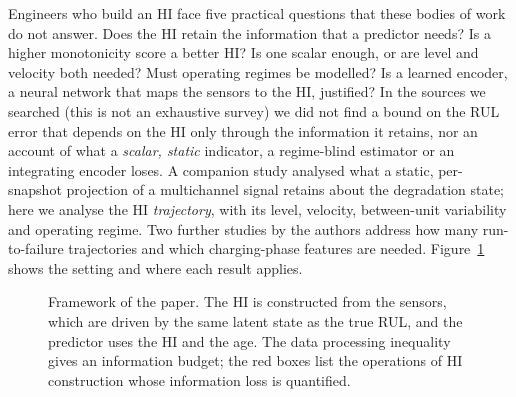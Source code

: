 \documentclass[preprint,12pt]{elsarticle}
\theoremstyle{definition}
\begin{document}
Engineers who build an HI face five practical questions that these bodies of work do not answer. Does the HI retain the information that a predictor needs? Is a higher monotonicity score a better HI? Is one scalar enough, or are level and velocity both needed? Must operating regimes be modelled? Is a learned encoder, a neural network that maps the sensors to the HI, justified? In the sources we searched (this is not an exhaustive survey) we did not find a bound on the RUL error that depends on the HI only through the information it retains, nor an account of what a \emph{scalar, static} indicator, a regime-blind estimator or an integrating encoder loses. A companion study \cite{le2026jestch} analysed what a static, per-snapshot projection of a multichannel signal retains about the degradation state; here we analyse the HI \emph{trajectory}, with its level, velocity, between-unit variability and operating regime. Two further studies by the authors address how many run-to-failure trajectories \cite{le2026mst} and which charging-phase features \cite{le2026ein} are needed. Figure~\ref{fig:framework} shows the setting and where each result applies.

\begin{figure}[!t]
\centering
\resizebox{\textwidth}{!}{}
\caption{Framework of the paper. The HI is constructed from the sensors, which are driven by the same latent state as the true RUL, and the predictor uses the HI and the age. The data processing inequality gives an information budget; the red boxes list the operations of HI construction whose information loss is quantified.}
\label{fig:framework}
\end{figure}
\end{document}
